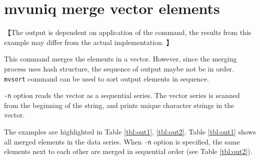 \documentclass[a4paper]{jarticle}
\begin{document}
\renewcommand{\tablename}{Table }

\setlength{\baselineskip}{4mm}

\section*{mvuniq merge vector elements}

【The output is dependent on application of the command, the results from this example may differ from the actual implementation. 】

This command merges the elements in a vector. However, since the merging process uses hash structure, the sequence of output maybe not be in order. \verb|mvsort| command can be used to sort output elements in sequence.    

 \verb|-n| option reads the vector as a sequential series. The vector series is scanned from the beginning of the string, and prints unique character strings in the vector. 

The examples are highlighted in Table \ref{tbl:out1}, \ref{tbl:out2}.
Table \ref{tbl:out1} shows all merged elements in the data series. When \verb|-n| option is specified, the same elements next to each other are merged in sequential order (see Table \ref{tbl:out2}). 
\end{document}
